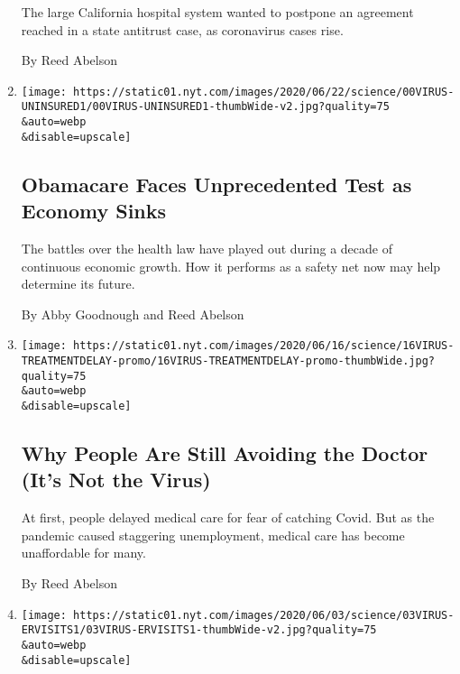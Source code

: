 \begin{enumerate}
  The large California hospital system wanted to postpone an agreement
  reached in a state antitrust case, as coronavirus cases rise.

  By Reed Abelson
\item
  \href{/2020/06/27/health/coronavirus-obamacare-unemployment-health-coverage.html}{}

  \texttt{[image: https://static01.nyt.com/images/2020/06/22/science/00VIRUS-UNINSURED1/00VIRUS-UNINSURED1-thumbWide-v2.jpg?quality=75\\\&auto=webp\\\&disable=upscale]}

  \hypertarget{obamacare-faces-unprecedented-test-as-economy-sinks}{%
  \subsection{Obamacare Faces Unprecedented Test as Economy
  Sinks}\label{obamacare-faces-unprecedented-test-as-economy-sinks}}

  The battles over the health law have played out during a decade of
  continuous economic growth. How it performs as a safety net now may
  help determine its future.

  By Abby Goodnough and Reed Abelson
\item
  \href{/2020/06/16/health/coronavirus-insurance-healthcare.html}{}

  \texttt{[image: https://static01.nyt.com/images/2020/06/16/science/16VIRUS-TREATMENTDELAY-promo/16VIRUS-TREATMENTDELAY-promo-thumbWide.jpg?quality=75\\\&auto=webp\\\&disable=upscale]}

  \hypertarget{why-people-are-still-avoiding-the-doctor-its-not-the-virus}{%
  \subsection{Why People Are Still Avoiding the Doctor (It's Not the
  Virus)}\label{why-people-are-still-avoiding-the-doctor-its-not-the-virus}}

  At first, people delayed medical care for fear of catching Covid. But
  as the pandemic caused staggering unemployment, medical care has
  become unaffordable for many.

  By Reed Abelson
\item
  \href{/2020/06/03/health/hospitals-coronavirus.html}{}

  \texttt{[image: https://static01.nyt.com/images/2020/06/03/science/03VIRUS-ERVISITS1/03VIRUS-ERVISITS1-thumbWide-v2.jpg?quality=75\\\&auto=webp\\\&disable=upscale]}

  \hypertarget{er-visits-drop-sharply-during-pandemic}{%
}
\end{enumerate}
